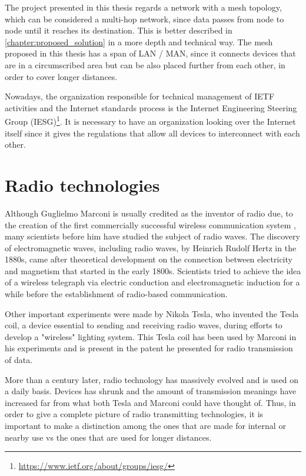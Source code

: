 		The project presented in this thesis regards a network with a mesh topology, which can be considered a multi-hop network, since data passes from node to node until it reaches its destination.
		This is better described in \ref{chapter:proposed_solution} in a more depth and technical way.
		The mesh proposed in this thesis has a span of LAN / MAN, since it connects devices that are in a circumscribed area but can be also placed further from each other, in order to cover longer distances.
			
		Nowadays, the organization responsible for technical management of IETF activities and the Internet standards process is the Internet Engineering Steering Group (IESG)\footnote{\url{https://www.ietf.org/about/groups/iesg/}}.
		It is necessary to have an organization looking over the Internet itself since it gives the regulations that allow all devices to interconnect with each other.
	
	\section{Radio technologies}\label{sec:radio_tech}
		
		Although Guglielmo Marconi is usually credited as the inventor of radio due, to the creation of the first commercially successful wireless communication system \cite{4137304}, many scientists before him have studied the subject of radio waves.
		The discovery of electromagnetic waves, including radio waves, by Heinrich Rudolf Hertz in the 1880s, came after theoretical development on the connection between electricity and magnetism that started in the early 1800s.
		Scientists tried to achieve the idea of a wireless telegraph via electric conduction and electromagnetic induction for a while before the establishment of radio-based communication.
		
		Other important experiments were made by Nikola Tesla, who invented the Tesla coil, a device essential to sending and receiving radio waves, during efforts to develop a "wireless" lighting system.
		This Tesla coil has been used by Marconi in his experiments and is present in the patent he presented for radio transmission of data.
		
		More than a century later, radio technology has massively evolved and is used on a daily basis.
		Devices has shrunk and the amount of transmission meanings have increased far from what both Tesla and Marconi could have thought of.
		Thus, in order to give a complete picture of radio transmitting technologies, it is important to make a distinction among the ones that are made for internal or nearby use vs the ones that are used for longer distances.
		
